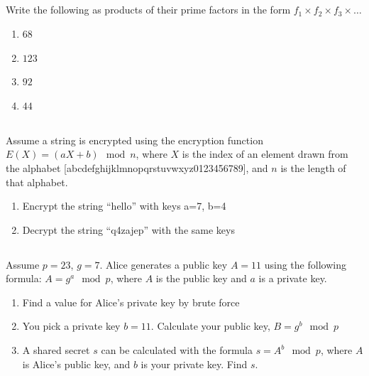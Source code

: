\documentclass[twocolumn]{article}
\begin{document}
\subsection{}

    Write the following as products of their prime factors in the form $ f_1 \times f_2 \times f_3 \times \dots $

    \begin{multicols}{2}
        \begin{enumerate}
            \item $68$
            \item $123$
            \item $92$
            \item $44$
        \end{enumerate}
    \end{multicols}

\subsection{}

    Assume a string is encrypted using the encryption function $E(X) = (aX + b) \mod n$, where $X$ is the index of an element drawn from the alphabet [abcdefghijklmnopqrstuvwxyz0123456789], and $n$ is the length of that alphabet.

    \begin{enumerate}
        \item Encrypt the string ``hello'' with keys a=7, b=4
        \item Decrypt the string ``q4zajep'' with the same keys
    \end{enumerate}

\subsection{}

    Assume $p = 23$, $g = 7$. Alice generates a public key $A = 11$ using the following formula: $A = g^a \mod p$, where $A$ is the public key and $a$ is a private key.

    \begin{enumerate}
        \item Find a value for Alice’s private key by brute force
        \item You pick a private key $b = 11$. Calculate your public key, $B = g^b \mod p$
        \item A shared secret $s$ can be calculated with the formula $s = A^b \mod p$, where $A$ is Alice’s public key, and $b$ is your private key. Find $s$.
    \end{enumerate}
\end{document}
